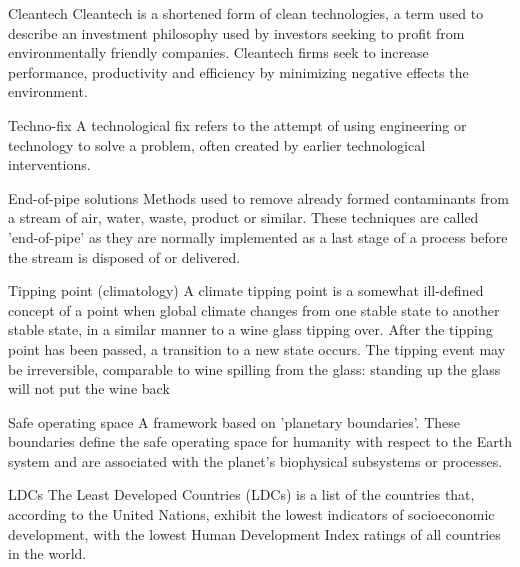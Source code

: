 \begin{sortEnvironment}{Cleantech}
Cleantech is a shortened form of clean technologies, a term used to describe an investment philosophy used by investors seeking to profit from environmentally friendly companies. Cleantech firms seek to increase performance, productivity and efficiency by minimizing negative effects the environment.
\end{sortEnvironment}

\begin{sortEnvironment}{Techno-fix}
A technological fix refers to the attempt of using engineering or technology to solve a problem, often created by earlier technological interventions. 
\end{sortEnvironment}

\begin{sortEnvironment}{End-of-pipe solutions}
Methods used to remove already formed contaminants from a stream of air, water, waste, product or similar. These techniques are called 'end-of-pipe' as they are normally implemented as a last stage of a process before the stream is disposed of or delivered. 
\end{sortEnvironment}

\begin{sortEnvironment}{Tipping point (climatology)}
A climate tipping point is a somewhat ill-defined concept of a point when global climate changes from one stable state to another stable state, in a similar manner to a wine glass tipping over. After the tipping point has been passed, a transition to a new state occurs. The tipping event may be irreversible, comparable to wine spilling from the glass: standing up the glass will not put the wine back
\end{sortEnvironment}

\begin{sortEnvironment}{Safe operating space}
A framework based on 'planetary boundaries'. These boundaries define the safe operating space for humanity with respect to the Earth system and are associated with the planet's biophysical subsystems or processes. 
\end{sortEnvironment}

\begin{sortEnvironment}{LDCs}
The Least Developed Countries (LDCs) is a list of the countries that, according to the United Nations, exhibit the lowest indicators of socioeconomic development, with the lowest Human Development Index ratings of all countries in the world. 
\end{sortEnvironment}

